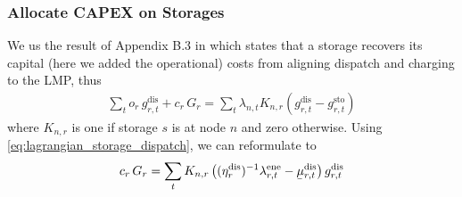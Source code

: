 \documentclass[11pt,twocolumn]{article}
\newcommand{\ubar}[1]{\underaccent{\bar}{#1}}
\newcommand{\storage}{g_{r,t}}
\newcommand{\storagedispatch}{\storage^\text{dis}}
\newcommand{\storagecharge}{\storage^\text{sto}}
\newcommand{\storagesoc}{\storage^\text{ene}}
\newcommand{\efficiency}{\eta_{r}}
\newcommand{\efficiencydispatch}{\efficiency^\text{dis}}
\newcommand{\operationalpricestorage}{o_r}
\newcommand{\capitalpricestorage}{c_r}
\newcommand{\capacitystorage}{G_r}
\newcommand{\mulowerstoragedispatch}{\ubar{\mu}_{r,t}^\text{dis}}
\newcommand{\muupperstoragedispatch}{\bar{\mu}_{r,t}^\text{dis}}
\newcommand{\muupperstoragecharge}{\bar{\mu}_{r,t}^\text{sto}}
\newcommand{\muupperstoragesoc}{\bar{\mu}_{r,t}^\text{ene}}
\newcommand{\mustateofcharge}{\lambda^\text{ene}_{r,t}}
\newcommand{\lmp}[1][n]{\lambda_{#1,t}}
\newcommand{\incidencestorage}[1][n]{K_{#1,r}}
\newcommand{\capexstorage}{\mathcal{C}^E}
\begin{document}
\subsubsection*{Allocate CAPEX on Storages}


We us the result of Appendix B.3 in \cite{brown_decreasing_2020} which states that a storage recovers its capital (here we added the operational) costs from aligning dispatch and charging to the LMP, thus 
\begin{align}
    \sum_t \operationalpricestorage \, \storagedispatch + \capitalpricestorage \, \capacitystorage = \sum_t \lmp \incidencestorage \left(\storagedispatch - \storagecharge \right) 
\end{align}
where $\incidencestorage$ is one if storage $s$ is at node $n$ and zero otherwise. Using \cref{eq:lagrangian_storage_dispatch}, we can reformulate to 
\begin{align}
    \capitalpricestorage \, \capacitystorage = \sum_t \incidencestorage \left( (\efficiencydispatch )^{-1} \mustateofcharge - \mulowerstoragedispatch \right) \storagedispatch 
\end{align}



\end{document}
